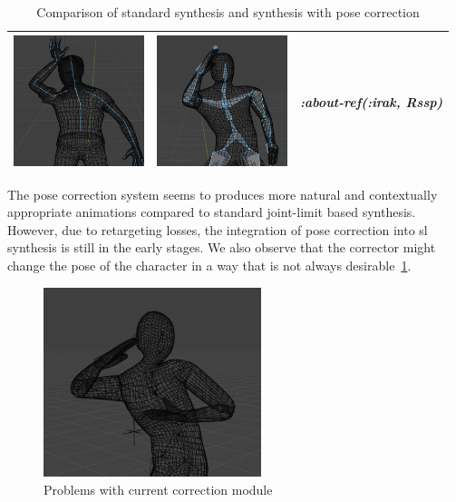 \documentclass[../../main.tex]{subfiles}
\begin{document}
\begin{table}
\begin{tabular}{|c|c|c|}
    \includegraphics[width = 1.5in]{chapters/intermediate_blocks_pose_correction/images/standard_synthesis_abt_ref_irak.png} & \includegraphics[width = 1.5in]{chapters/intermediate_blocks_pose_correction/images/pose_correction_synthesis_abt_ref_irak.png} &
      \emph{:about-ref(:irak, Rssp)} \\
    \hline
  \end{tabular}
  \caption{Comparison of standard synthesis and synthesis with pose correction}
  \label{tab:results}
\end{table}

The pose correction system seems to produces more natural and contextually appropriate animations compared to standard joint-limit based synthesis. However, due to retargeting losses, the integration of pose correction into \gls{sl} synthesis is still in the early stages. We also observe that the corrector might change the pose of the character in a way that is not always desirable~\ref{fig:problem_pose_correction}.

\begin{figure}
  \centering \includegraphics[width = 2.5in]{chapters/intermediate_blocks_pose_correction/images/problem_pose_correction.png}
  \caption{Problems with current correction module}
  \label{fig:problem_pose_correction}
\end{figure}
\end{document}
